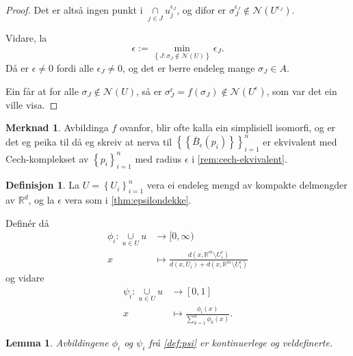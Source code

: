\documentclass[a4paper, 12pt, norsk]{article}
\theoremstyle{plain}
\newtheorem{lemma}[theorem]{Lemma}
\theoremstyle{definition}
\newtheorem{definition}[theorem]{Definisjon}
\newtheorem{remark}[theorem]{Merknad}
\newcommand{\Rb}{\mathbb{R}}
\newcommand{\Nc}{\mathcal{N}}
\newcommand{\intersect}{ \mathop{\cap}\limits }
\newcommand{\union}{ \mathop{\cup}\limits }
\newcommand{\set}[1]{ \left\{ #1 \right\} } %
\begin{document}
\begin{proof}
	Det er altså ingen punkt i \( \intersect_{j \in J} u_j^{\epsilon_J} \), og difor er \( \sigma_J^{\epsilon_J} \not\in \Nc(U^{\epsilon_J}) \).

	Vidare, la
	\[
		\epsilon := \min_{\set{J : \sigma_J \not\in \Nc(U)}} \epsilon_J.
	\]
	Då er \( \epsilon \neq 0 \) fordi alle \( \epsilon_J \neq 0 \), og det er berre endeleg mange \( \sigma_J \in A \).

	Ein får at for alle \( \sigma_J \not\in \Nc(U) \), så er \( \sigma_J^{\epsilon}=f(\sigma_J) \not\in \Nc(U^{\epsilon}) \), som var det ein ville visa.
\end{proof}

\begin{remark}
	Avbildinga \( f \) ovanfor, blir ofte kalla ein simplisiell isomorfi, og er det eg peika til då eg skreiv at nerva til \( \set{\set{\bar{B}_\epsilon(p_i)}}_{i=1}^n \) er ekvivalent med Cech-komplekset av \( \set{p_i}_{i=1}^n \) med radius \( \epsilon \) i \autoref{rem:cech-ekvivalent}.
\end{remark}

\begin{definition} \label{def:psi}
	La \( U = \set{U_i}_{i=1}^n \) vera ei endeleg mengd av kompakte delmengder av \( \Rb^d \), og la \( \epsilon \) vera som i \autoref{thm:epsilondekke}.

	Definér då
	\begin{align*}
		\phi_i : \union_{u \in U} u &\to [0, \infty) \\
		x &\mapsto \frac{d(x, \Rb^m \setminus U_i^\epsilon)}{d(x, U_i) + d(x, \Rb^m \setminus U_i^\epsilon)}
	\end{align*}
	og vidare
	\begin{align*}
		\psi_i : \union_{u \in U} u &\to [0, 1] \\
		x &\mapsto \frac{\phi_i(x)}{\sum_{k=1}^n \phi_k(x)}.
	\end{align*}
\end{definition}

\begin{lemma}
	Avbildingene \( \phi_i \) og \( \psi_i \) frå \autoref{def:psi} er kontinuerlege og veldefinerte.
\end{lemma}
\end{document}
